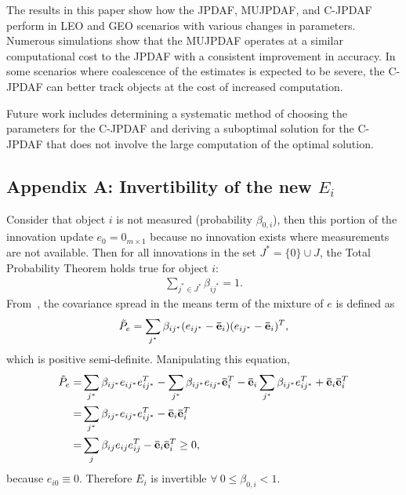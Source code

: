 \documentclass[letterpaper, paper,10pt]{AAS}		%
\begin{document}
The results in this paper show how the JPDAF, MUJPDAF, and C-JPDAF perform in LEO and GEO scenarios with various changes in parameters.
Numerous simulations show that the MUJPDAF operates at a similar computational cost to the JPDAF with a consistent improvement in accuracy.
In some scenarios where coalescence of the estimates is expected to be severe, the C-JPDAF can better track objects at the cost of increased computation.

Future work includes determining a systematic method of choosing the parameters for the C-JPDAF and deriving a suboptimal solution for the C-JPDAF that does not involve the large computation of the optimal solution.



\begin{appendix}
\label{append}

\subsection{Appendix A: Invertibility of the new $E_i$} \label{NewPartOfEIsPSD}
Consider that object $i$ is not measured (probability $\beta_{0,i}$), then this portion of the innovation update $e_0=0_{m\times1}$ because no innovation exists where measurements are not available.
Then for all innovations in the set $J^*=\{0\}\cup J$, the Total Probability Theorem holds true for object $i$:
\begin{align}
\sum\limits_{j^*\in J^*}\beta_{ij^*}=1.
\end{align}
From~\cite[Eq. 1.4.16-(1-10)]{ShaRonThi2001}, the covariance spread in the means term of the mixture of $e$ is defined as%
\begin{align}
\tilde P_e=\sum\limits_{j^*}\beta_{ij^*}(e_{ij^*}-{\bf\bar e}_{i})(e_{ij^*}-{\bf\bar e}_{i})^T,
\end{align}
which is positive semi-definite. Manipulating this equation,
\begin{align}
\tilde P_e=&\sum\limits_{j^*}\beta_{ij^*}e_{ij^*}e_{ij^*}^T
-\sum\limits_{j^*}\beta_{ij^*}e_{ij^*}{\bf\bar e}_{i}^T
-{\bf\bar e}_{i}\sum\limits_{j^*}\beta_{ij^*}e_{ij^*}^T
+{\bf\bar e}_{i}{\bf\bar e}_{i}^T\nonumber%
\\
=&\sum\limits_{j^*}\beta_{ij^*}e_{ij^*}e_{ij^*}^T-{\bf\bar e}_{i}{\bf\bar e}_{i}^T\nonumber
\\
=&\sum\limits_{j}\beta_{ij}e_{ij}e_{ij}^T-{\bf\bar e}_{i}{\bf\bar e}_{i}^T\geq0,
\label{eqn:CovSpreadPSD}
\end{align}
because $e_{i0}\equiv0$. Therefore $E_i$ is invertible $\forall\ 0\leq\beta_{0,i}<1$.



\end{appendix}
\end{document}
